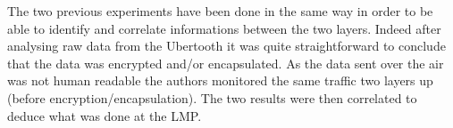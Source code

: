 The two previous experiments have been done in the same way in order to be able to identify and correlate informations between the two layers.
Indeed after analysing raw data from the Ubertooth it was quite straightforward to conclude that the data was encrypted and/or encapsulated. 
As the data sent over the air was not human readable the authors monitored the same traffic two layers up (before encryption/encapsulation). The two results were then correlated to deduce what was done at the LMP.